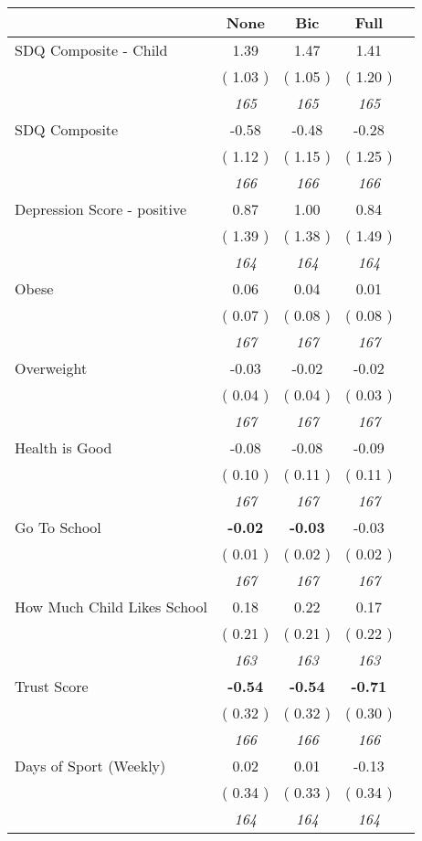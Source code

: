 \begin{tabular}{l c c c c}
\toprule
 & None & Bic & Full \\
\midrule
SDQ Composite - Child &      1.39 &      1.47 &      1.41 \\
& (     1.03 ) & (     1.05 ) & (     1.20 ) \\
& \textit{ 165 } & \textit{ 165 } & \textit{ 165 } \\
SDQ Composite &     -0.58 &     -0.48 &     -0.28 \\
& (     1.12 ) & (     1.15 ) & (     1.25 ) \\
& \textit{ 166 } & \textit{ 166 } & \textit{ 166 } \\
Depression Score - positive &      0.87 &      1.00 &      0.84 \\
& (     1.39 ) & (     1.38 ) & (     1.49 ) \\
& \textit{ 164 } & \textit{ 164 } & \textit{ 164 } \\
Obese &      0.06 &      0.04 &      0.01 \\
& (     0.07 ) & (     0.08 ) & (     0.08 ) \\
& \textit{ 167 } & \textit{ 167 } & \textit{ 167 } \\
Overweight &     -0.03 &     -0.02 &     -0.02 \\
& (     0.04 ) & (     0.04 ) & (     0.03 ) \\
& \textit{ 167 } & \textit{ 167 } & \textit{ 167 } \\
Health is Good &     -0.08 &     -0.08 &     -0.09 \\
& (     0.10 ) & (     0.11 ) & (     0.11 ) \\
& \textit{ 167 } & \textit{ 167 } & \textit{ 167 } \\
Go To School & \textbf{     -0.02 } & \textbf{     -0.03 } &     -0.03 \\
& (     0.01 ) & (     0.02 ) & (     0.02 ) \\
& \textit{ 167 } & \textit{ 167 } & \textit{ 167 } \\
How Much Child Likes School &      0.18 &      0.22 &      0.17 \\
& (     0.21 ) & (     0.21 ) & (     0.22 ) \\
& \textit{ 163 } & \textit{ 163 } & \textit{ 163 } \\
Trust Score & \textbf{     -0.54 } & \textbf{     -0.54 } & \textbf{     -0.71 } \\
& (     0.32 ) & (     0.32 ) & (     0.30 ) \\
& \textit{ 166 } & \textit{ 166 } & \textit{ 166 } \\
Days of Sport (Weekly) &      0.02 &      0.01 &     -0.13 \\
& (     0.34 ) & (     0.33 ) & (     0.34 ) \\
& \textit{ 164 } & \textit{ 164 } & \textit{ 164 } \\
\bottomrule
\end{tabular}

